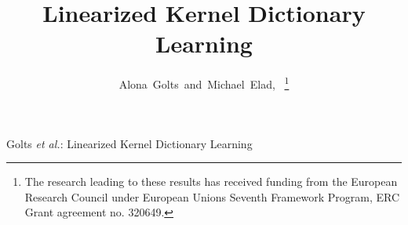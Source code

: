 \documentclass[journal]{IEEEtran}
\begin{document}
%
\title{Linearized Kernel Dictionary Learning}
%
%
%

\author{Alona~Golts~and~Michael~Elad,~%
       \thanks{The research leading to these results has received funding from the
European Research Council under European Unions Seventh Framework
Program, ERC Grant agreement no. 320649.}
}


%
%



\markboth{}%
{Golts \MakeLowercase{\textit{et al.}}: Linearized Kernel Dictionary Learning}
%
\end{document}
